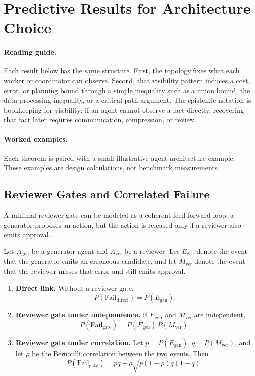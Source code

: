 \section{Predictive Results for Architecture Choice}

\paragraph{Reading guide.}
Each result below has the same structure. First, the topology fixes what each worker or coordinator can
observe. Second, that visibility pattern induces a cost, error, or planning bound through a simple
inequality such as a union bound, the data processing inequality, or a critical-path argument. The
epistemic notation is bookkeeping for visibility: if an agent cannot observe a fact directly, recovering
that fact later requires communication, compression, or review.

\paragraph{Worked examples.}
Each theorem is paired with a small illustrative agent-architecture example. These examples are design
calculations, not benchmark measurements.

\subsection{Reviewer Gates and Correlated Failure}

A minimal reviewer gate can be modeled as a coherent feed-forward loop: a generator proposes an action,
but the action is released only if a reviewer also emits approval.

\begin{theorem}
\label{thm:reviewer-gate}
Let $A_{\mathrm{gen}}$ be a generator agent and $A_{\mathrm{ver}}$ be a reviewer. Let
$E_{\mathrm{gen}}$ denote the event that the generator emits an erroneous candidate, and let
$M_{\mathrm{ver}}$ denote the event that the reviewer misses that error and still emits approval.
\begin{enumerate}[leftmargin=*]
\item[(a)] \textbf{Direct link.} Without a reviewer gate,
\[
P(\mathrm{Fail}_{\mathrm{direct}}) = P(E_{\mathrm{gen}}).
\]
\item[(b)] \textbf{Reviewer gate under independence.} If $E_{\mathrm{gen}}$ and $M_{\mathrm{ver}}$ are independent,
\[
P(\mathrm{Fail}_{\mathrm{gate}}) = P(E_{\mathrm{gen}})\,P(M_{\mathrm{ver}}).
\]
\item[(c)] \textbf{Reviewer gate under correlation.} Let $p = P(E_{\mathrm{gen}})$, $q = P(M_{\mathrm{ver}})$,
and let $\rho$ be the Bernoulli correlation between the two events. Then
\[
P(\mathrm{Fail}_{\mathrm{gate}})
= pq + \rho\sqrt{p(1-p)q(1-q)}.
\]
\end{enumerate}
\end{theorem}

